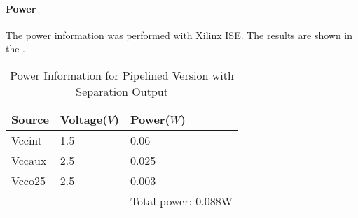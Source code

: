 \paragraph{Power}
The power information was performed with Xilinx ISE. The results are shown in the .

\begin{table}[!ht]
	\renewcommand{\arraystretch}{1.3}
	\caption{Power Information for Pipelined Version with Separation Output}
	\centering
	\begin{tabular}{ p{4cm} p{4cm} p{4cm} }
		\hline
		\bfseries Source & \bfseries Voltage(\(V\)) & \bfseries Power(\(W\)) \\
		\hline
		Vccint           & 1.5                      & 0.06                   \\
		Vccaux           & 2.5                      & 0.025                  \\
		Vcco25           & 2.5                      & 0.003                  \\
		\hline
		                 &                          & Total power: 0.088W    \\
	\end{tabular}
	\label{tb:p_sep_power}
\end{table}
